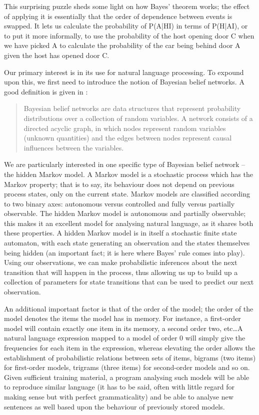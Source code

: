This surprising puzzle sheds some light on how Bayes' theorem works; the effect
of applying it is essentially that the order of dependence between events is
swapped. It lets us calculate the probability of P(A|HI) in terms of P(H|AI),
or to put it more informally, to use the probability of the host opening door C
when we have picked A to calculate the probability of the car being behind door
A given the host has opened door C.

Our primary interest is in its use for natural language processing. To
expound upon this, we first need to introduce the notion of Bayesian belief
networks. A good definition is given in \citet[80]{bod2004}:

\begin{quote}
Bayesian belief networks are data structures that represent probability
distributions over a collection of random variables. A network consists of a
directed acyclic graph, in which nodes represent random variables (unknown
quantities) and the edges between nodes represent causal influences between the
variables.
\end{quote}

We are particularly interested in one specific type of Bayesian belief network
-- the hidden Markov model. A Markov model is a stochastic process which has
the Markov property; that is to say, its behaviour does not depend on previous
process states, only on the current state. Markov models are classified
according to two binary axes: autonomous versus controlled and fully versus
partially observable. The hidden Markov model is autonomous and partially
observable; this makes it an excellent model for analysing natural language, as
it shares both these properties. A hidden Markov model is in itself a
stochastic finite state automaton, with each state generating an observation
and the states themselves being hidden (an important fact; it is here where
Bayes' rule comes into play). Using our observations, we can make probabilistic
inferences about the next transition that will happen in the process, thus
allowing us up to build up a collection of parameters for state transitions
that can be used to predict our next observation.

An additional important factor is that of the order of the model; the order of
the model denotes the items the model has in memory. For instance, a
first-order model will contain exactly one item in its memory, a second order
two, etc\ldots A natural language expression mapped to a model of order 0 will
simply give the frequencies for each item in the expression, whereas elevating
the order allows the establishment of probabilistic relations between sets of
items, bigrams (two items) for first-order models, trigrams (three items) for
second-order models and so on. Given sufficient training material, a program
analysing such models will be able to reproduce similar language (it has to be
said, often with little regard for making sense but with perfect
grammaticality) and be able to analyse new sentences as well based upon the
behaviour of previously stored models.

